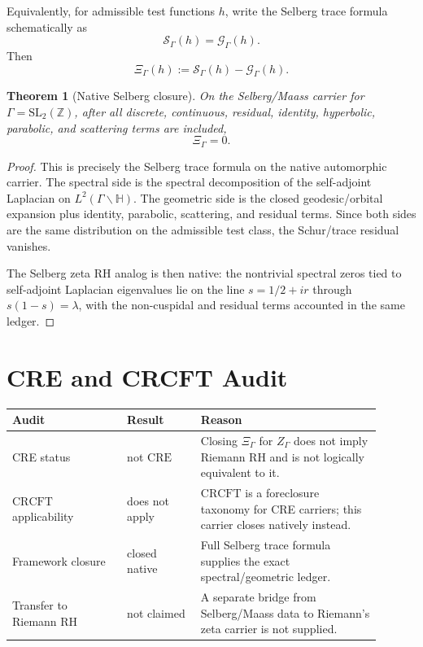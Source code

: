 \documentclass[11pt]{article}
\newtheorem{theorem}{Theorem}
\newcommand{\Hh}{\mathbb H}
\newcommand{\XiGamma}{\Xi_{\Gamma}}
\newcommand{\ZG}{Z_{\Gamma}}
\newcommand{\CRE}{\mathrm{CRE}}
\newcommand{\CRCFT}{\mathrm{CRCFT}}
\begin{document}
Equivalently, for admissible test functions \(h\), write the Selberg trace
formula schematically as
\[
\mathcal S_\Gamma(h)=\mathcal G_\Gamma(h).
\]
Then
\[
\XiGamma(h):=\mathcal S_\Gamma(h)-\mathcal G_\Gamma(h).
\]

\begin{theorem}[Native Selberg closure]
On the Selberg/Maass carrier for \(\Gamma=\mathrm{SL}_2(\mathbb Z)\), after
all discrete, continuous, residual, identity, hyperbolic, parabolic, and
scattering terms are included,
\[
\XiGamma=0.
\]
\end{theorem}

\begin{proof}
This is precisely the Selberg trace formula on the native automorphic
carrier.  The spectral side is the spectral decomposition of the self-adjoint
Laplacian on \(L^2(\Gamma\backslash\Hh)\).  The geometric side is the closed
geodesic/orbital expansion plus identity, parabolic, scattering, and residual
terms.  Since both sides are the same distribution on the admissible test
class, the Schur/trace residual vanishes.

The Selberg zeta RH analog is then native: the nontrivial spectral zeros tied
to self-adjoint Laplacian eigenvalues lie on the line \(s=1/2+ir\) through
\(s(1-s)=\lambda\), with the non-cuspidal and residual terms accounted in the
same ledger.
\end{proof}

\section*{CRE and CRCFT Audit}

\begin{center}
\begin{tabular}{p{0.28\linewidth}p{0.18\linewidth}p{0.44\linewidth}}
\toprule
Audit & Result & Reason\\
\midrule
CRE status & not \(\CRE\)
& Closing \(\XiGamma\) for \(\ZG\) does not imply Riemann RH and is not
logically equivalent to it.\\
\(\CRCFT\) applicability & does not apply
& \(\CRCFT\) is a foreclosure taxonomy for CRE carriers; this carrier closes
natively instead.\\
Framework closure & closed native
& Full Selberg trace formula supplies the exact spectral/geometric ledger.\\
Transfer to Riemann RH & not claimed
& A separate bridge from Selberg/Maass data to Riemann's zeta carrier is not
supplied.\\
\bottomrule
\end{tabular}
\end{center}
\end{document}
